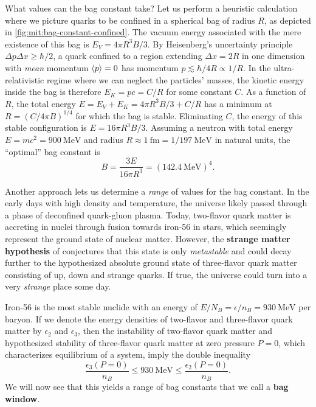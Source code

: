 What values can the bag constant take?
Let us perform a heuristic calculation where we picture quarks to be confined in a spherical bag of radius $R$, as depicted in \cref{fig:mit:bag-constant-confined}.
The vacuum energy associated with the mere existence of this bag is $E_V = 4 \pi R^3 B / 3$.
By Heisenberg's uncertainty principle $\Delta p \Delta x \geq \hbar/2$, a quark confined to a region extending $\Delta x = 2R$ in one dimension with \emph{mean} momentum $\langle p \rangle = 0$ has momentum $p \lesssim \hbar/4R \propto 1/R$.
In the ultra-relativistic regime where we can neglect the particles' masses, the kinetic energy inside the bag is therefore $E_K = pc = C / R$ for some constant $C$.
As a function of $R$, the total energy $E = E_V + E_K = 4 \pi R^3 B / 3 + C/R$ has a minimum at $R = (C/4 \pi B)^{1/4}$ for which the bag is stable.
Eliminating $C$, the energy of this stable configuration is $E = 16 \pi R^3 B / 3$.
Assuming a neutron with total energy $E = m c^2 = \SI{900}{\mega\electronvolt}$ and radius $R \approx \SI{1}{\femto\meter} = 1 / \SI{197}{\mega\electronvolt}$ in natural units,
the ``optimal'' bag constant is
\begin{equation}
	B = \frac{3 E}{16 \pi R^3} = (\SI{142.4}{\mega\electronvolt})^4.
\label{eq:mit:bag_constant_optimal}
\end{equation}

\pagebreak
Another approach lets us determine a \emph{range} of values for the bag constant.
In the early days with high density and temperature, the universe likely passed through a phase of deconfined quark-gluon plasma. \cite{ref:glendenning}
Today, two-flavor quark matter is accreting in nuclei through fusion towards iron-56 in stars, which seemingly represent the ground state of nuclear matter.
However, the \textbf{strange matter hypothesis} of \cite{ref:strange_hypothesis_bodmer,ref:strange_hypothesis_witten} conjectures that this state is only \emph{metastable}
and could decay further to the hypothesized absolute ground state of three-flavor quark matter consisting of up, down and strange quarks.
If true, the universe could turn into a very \emph{strange} place some day.

Iron-56 is the most stable nuclide with an energy of $E/N_B = \epsilon/n_B = \SI{930}{\mega\electronvolt}$ per baryon. \cite{ref:glendenning}
If we denote the energy densities of two-flavor and three-flavor quark matter by $\epsilon_2$ and $\epsilon_3$,
then the instability of two-flavor quark matter
and hypothesized stability of three-flavor quark matter
at zero pressure $P=0$,
which characterizes equilibrium of a system,
imply the double inequality
\begin{equation}
	\frac{\epsilon_3(P=0)}{n_B} \leq \SI{930}{\mega\electronvolt} \leq \frac{\epsilon_2(P=0)}{n_B} .
\label{eq:mit:bag_stability}
\end{equation}
We will now see that this yields a range of bag constants that we call a \textbf{bag window}.

